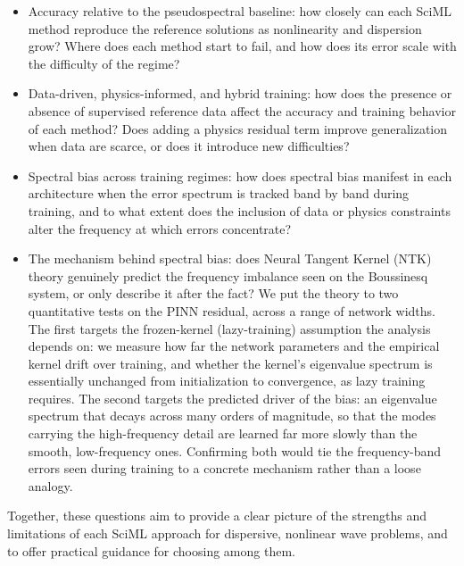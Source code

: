 \begin{itemize}
    \item Accuracy relative to the pseudospectral baseline: how closely can
          each SciML method reproduce the reference solutions as nonlinearity and
          dispersion grow? Where does each method start to fail, and how does its error
          scale with the difficulty of the regime?

    \item Data-driven, physics-informed, and hybrid training: how does the
          presence or absence of supervised reference data affect the accuracy and
          training behavior of each method? Does adding a physics residual term improve
          generalization when data are scarce, or does it introduce new difficulties?

    \item Spectral bias across training regimes: how does spectral bias
          manifest in each architecture when the error spectrum is tracked band by band
          during training, and to what extent does the inclusion of data or physics
          constraints alter the frequency at which errors concentrate?

    \item The mechanism behind spectral bias: does Neural Tangent Kernel
          (NTK) theory genuinely predict the frequency imbalance seen on the Boussinesq
          system, or only describe it after the fact? We put the theory to two
          quantitative tests on the PINN residual, across a range of network widths. The
          first targets the frozen-kernel (lazy-training) assumption the analysis
          depends on: we measure how far the network parameters and the empirical kernel
          drift over training, and whether the kernel's eigenvalue spectrum is
          essentially unchanged from initialization to convergence, as lazy training
          requires. The second targets the predicted driver of the bias: an eigenvalue
          spectrum that decays across many orders of magnitude, so that the modes
          carrying the high-frequency detail are learned far more slowly than the
          smooth, low-frequency ones. Confirming both would tie the frequency-band
          errors seen during training to a concrete mechanism rather than a loose
          analogy.
\end{itemize}

Together, these questions aim to provide a clear picture of the strengths and limitations
of each SciML approach for dispersive, nonlinear wave problems, and to offer practical
guidance for choosing among them.

